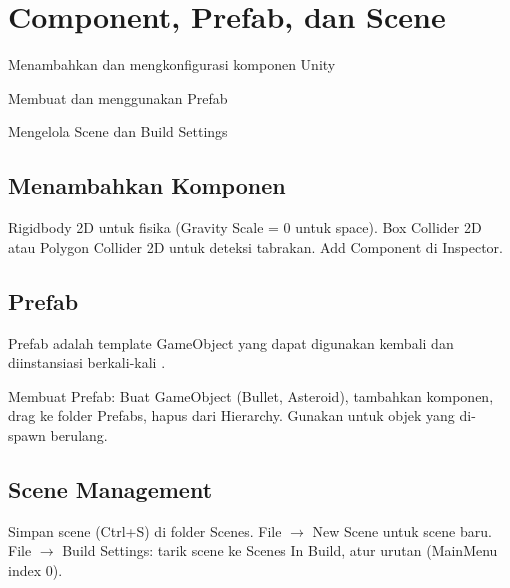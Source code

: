 \section{Component, Prefab, dan Scene}

\begin{learningoutcomes}
\item Menambahkan dan mengkonfigurasi komponen Unity
\item Membuat dan menggunakan Prefab
\item Mengelola Scene dan Build Settings
\end{learningoutcomes}

\subsection{Menambahkan Komponen}

Rigidbody 2D untuk fisika (Gravity Scale = 0 untuk space). Box Collider 2D atau Polygon Collider 2D untuk deteksi tabrakan. Add Component di Inspector.

\subsection{Prefab}

\begin{definisi}[Prefab]
Prefab adalah template GameObject yang dapat digunakan kembali dan diinstansiasi berkali-kali \cite{UnityManual2024}.
\end{definisi}

Membuat Prefab: Buat GameObject (Bullet, Asteroid), tambahkan komponen, drag ke folder Prefabs, hapus dari Hierarchy. Gunakan untuk objek yang di-spawn berulang.

\subsection{Scene Management}

Simpan scene (Ctrl+S) di folder Scenes. File $\rightarrow$ New Scene untuk scene baru. File $\rightarrow$ Build Settings: tarik scene ke Scenes In Build, atur urutan (MainMenu index 0).
